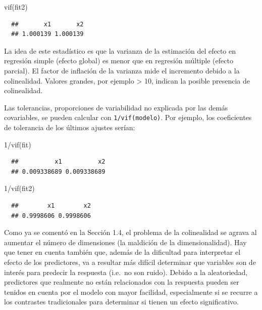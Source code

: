 \documentclass[
]{book}
\newenvironment{Shaded}{\begin{snugshade}}{\end{snugshade}}
\newcommand{\DecValTok}[1]{\textcolor[rgb]{0.00,0.00,0.81}{#1}}
\newcommand{\FunctionTok}[1]{\textcolor[rgb]{0.00,0.00,0.00}{#1}}
\newcommand{\NormalTok}[1]{#1}
\newcommand{\SpecialCharTok}[1]{\textcolor[rgb]{0.00,0.00,0.00}{#1}}
\theoremstyle{break}
\theoremstyle{nonumberplain}
\begin{document}
\begin{Shaded}
\begin{Highlighting}[]
\FunctionTok{vif}\NormalTok{(fit2) }
\end{Highlighting}
\end{Shaded}

\begin{verbatim}
  ##       x1       x2 
  ## 1.000139 1.000139
\end{verbatim}

La idea de este estadístico es que la varianza de la estimación del efecto en
regresión simple (efecto global) es menor que en regresión múltiple (efecto parcial).
El factor de inflación de la varianza mide el incremento debido a la colinealidad.
Valores grandes, por ejemplo \textgreater{} 10, indican la posible presencia de colinealidad.

Las tolerancias, proporciones de variabilidad no explicada por las demás covariables, se pueden calcular con \texttt{1/vif(modelo)}.
Por ejemplo, los coeficientes de tolerancia de los últimos ajustes serían:

\begin{Shaded}
\begin{Highlighting}[]
\DecValTok{1}\SpecialCharTok{/}\FunctionTok{vif}\NormalTok{(fit)}
\end{Highlighting}
\end{Shaded}

\begin{verbatim}
  ##          x1          x2 
  ## 0.009338689 0.009338689
\end{verbatim}

\begin{Shaded}
\begin{Highlighting}[]
\DecValTok{1}\SpecialCharTok{/}\FunctionTok{vif}\NormalTok{(fit2) }
\end{Highlighting}
\end{Shaded}

\begin{verbatim}
  ##        x1        x2 
  ## 0.9998606 0.9998606
\end{verbatim}

Como ya se comentó en la Sección 1.4, el problema de la colinealidad se agrava al aumentar el número de dimensiones (la maldición de la dimensionalidad).
Hay que tener en cuenta también que, además de la dificultad para interpretar el efecto de los predictores, va a resultar más difícil determinar que variables son de interés para predecir la respuesta (i.e.~no son ruido). Debido a la aleatoriedad, predictores que realmente no están relacionados con la respuesta pueden ser tenidos en cuenta por el modelo con mayor facilidad, especialmente si se recurre a los contrastes tradicionales para determinar si tienen un efecto significativo.
\end{document}
